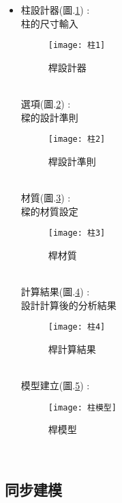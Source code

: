 \begin{itemize}
\newpage
	\item 柱設計器(圖.\ref{2.74}) :\\
		柱的尺寸輸入\\
		\begin{figure}[hbt!]
		\begin{center}
		\texttt{[image: 柱1]}
		\caption{\Large 桿設計器}\label{2.74}
		\end{center}
		\end{figure}
		\\
		選項(圖.\ref{2.75}) :\\
		樑的設計準則\\
		\begin{figure}[hbt!]
		\begin{center}
		\texttt{[image: 柱2]}
		\caption{\Large 桿設計準則}\label{2.75}
		\end{center}
		\end{figure}
		\\
		材質(圖.\ref{2.76}) :\\
		樑的材質設定\\
		\begin{figure}[hbt!]
		\begin{center}
		\texttt{[image: 柱3]}
		\caption{\Large 桿材質}\label{2.76}
		\end{center}
		\end{figure}
		\\
		計算結果(圖.\ref{2.77}) :\\
		設計計算後的分析結果\\
		\begin{figure}[hbt!]
		\begin{center}
		\texttt{[image: 柱4]}
		\caption{\Large 桿計算結果}\label{2.77}
		\end{center}
		\end{figure}
		\\
		模型建立(圖.\ref{2.78}) :\\
		\begin{figure}[hbt!]
		\begin{center}
		\texttt{[image: 柱模型]}
		\caption{\Large 桿模型}\label{2.78}
		\end{center}
		\end{figure}
		\\
\end{itemize}

\newpage


\subsection{同步建模}

